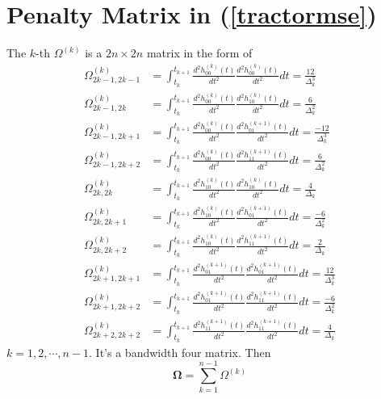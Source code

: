 
\section{Penalty Matrix in (\ref{tractormse})}


The $k$-th $\Omega^{(k)}$ is a $2n \times 2n$ matrix in the form of
\begin{align*}
\Omega_{2k-1,2k-1}^{(k)} & =\int_{t_{k}}^{t_{k+1}} \frac{d^2 h_{00}^{(k)}(t)}{dt^2}  \frac{d^2 h_{00}^{(k)}(t)}{dt^2} dt=\frac{12}{\Delta_k^3}\\
\Omega_{2k-1,2k}^{(k)} &=\int_{t_{k}}^{t_{k+1}} \frac{d^2 h_{00}^{(k)}(t)}{dt^2}  \frac{d^2 h_{10}^{(k)}(t)}{dt^2} dt=\frac{6}{\Delta_k^2}\\
\Omega_{2k-1,2k+1}^{(k)} &=\int_{t_{k}}^{t_{k+1}} \frac{d^2 h_{00}^{(k)}(t)}{dt^2}  \frac{d^2 h_{01}^{(k+1)}(t)}{dt^2} dt=\frac{-12}{\Delta_k^3}\\
\Omega_{2k-1,2k+2}^{(k)} &=\int_{t_{k}}^{t_{k+1}} \frac{d^2 h_{00}^{(k)}(t)}{dt^2}  \frac{d^2 h_{11}^{(k+1)}(t)}{dt^2} dt=\frac{6}{\Delta_k^2}\\
\Omega_{2k,2k}^{(k)} &=\int_{t_{k}}^{t_{k+1}} \frac{d^2 h_{10}^{(k)}(t)}{dt^2}  \frac{d^2 h_{10}^{(k)}(t)}{dt^2} dt=\frac{4}{\Delta_k} \\
\Omega_{2k,2k+1}^{(k)} &=\int_{t_{k}}^{t_{k+1}} \frac{d^2 h_{10}^{(k)}(t)}{dt^2}  \frac{d^2 h_{01}^{(k+1)}(t)}{dt^2} dt=\frac{-6}{\Delta_k^2}\\
\Omega_{2k,2k+2}^{(k)} &=\int_{t_{k}}^{t_{k+1}} \frac{d^2 h_{10}^{(k)}(t)}{dt^2}  \frac{d^2 h_{11}^{(k+1)}(t)}{dt^2} dt=\frac{2}{\Delta_k}\\
\Omega_{2k+1,2k+1}^{(k)} &=\int_{t_{k}}^{t_{k+1}} \frac{d^2 h_{01}^{(k+1)}(t)}{dt^2}  \frac{d^2 h_{01}^{(k+1)}(t)}{dt^2} dt=\frac{12}{\Delta_k^3}\\
\Omega_{2k+1,2k+2}^{(k)} &=\int_{t_{k}}^{t_{k+1}} \frac{d^2 h_{01}^{(k+1)}(t)}{dt^2}  \frac{d^2 h_{11}^{(k+1)}(t)}{dt^2} dt=\frac{-6}{\Delta_k^2}\\
\Omega_{2k+2,2k+2}^{(k)} &=\int_{t_{k}}^{t_{k+1}} \frac{d^2 h_{11}^{(k+1)}(t)}{dt^2}  \frac{d^2 h_{11}^{(k+1)}(t)}{dt^2} dt=\frac{4}{\Delta_k}
\end{align*}
$k=1,2,\cdots,n-1$. It's a bandwidth four matrix. Then
\begin{equation*}
\mathbf{\Omega}=\sum_{k=1}^{n-1}\Omega^{(k)}
\end{equation*}


